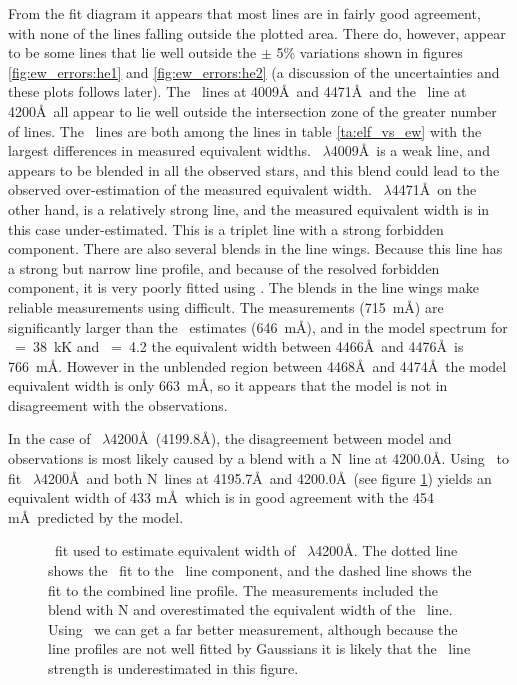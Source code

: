 From the fit diagram it appears that most lines are in fairly good
agreement, with none of the lines falling outside the plotted
area. There do, however, appear to be some lines that lie well
outside the $\pm$ 5\%  variations shown in figures
\ref{fig:ew_errors:he1} and \ref{fig:ew_errors:he2} (a discussion of
the uncertainties and these plots follows later). The \hei\ lines at
4009\AA\ and 4471\AA\ and the \heii\ line at 4200\AA\ all appear to
lie well outside the intersection zone of the greater number of
lines. The \hei\ lines are both among the lines in table
\ref{ta:elf_vs_ew} with the largest differences in measured equivalent
widths. \hei\ $\lambda$4009\AA\ is a weak line, and appears to be
blended in all the observed stars, and this blend could lead to the
observed over-estimation of the measured equivalent width. \hei\
$\lambda$4471\AA\ on the other hand, is a relatively strong line, and
the measured equivalent width is in this case under-estimated. This is a
triplet line with a strong forbidden component. There are also
several blends in the line wings. Because this line has a strong but
narrow line profile, and because of the resolved forbidden component,
it is very poorly fitted using \elf. The blends in the line wings make
reliable measurements using  difficult. The \comm{ew}
measurements (715~m\AA) are significantly larger than the \elf\
estimates (646~m\AA), and in the model spectrum for \teff ~=~38~kK and
\logg ~=~4.2 the equivalent width between 4466\AA\ and 4476\AA\ is
766~m\AA. However in the unblended region between 4468\AA\ and
4474\AA\ the model equivalent width is only 663~m\AA, so it appears
that the model is not in disagreement with the observations.

In the case of \heii\ $\lambda$4200\AA\ (4199.8\AA), the disagreement
between model and observations is most likely caused by a blend with
a N\ line at 4200.0\AA. Using \elf\ to fit \heii\
$\lambda$4200\AA\ and both N\scr{3}\ lines at 4195.7\AA\ and 4200.0\AA\
(see figure \ref{fig:he2_4200fit}) yields an equivalent width of 433
m\AA\ which is in good agreement with the 454 m\AA\ predicted by the model.

\begin{figure} %

\epsfxsize=12cm
\setlength{\cen}{(\textwidth / 2) - (\epsfxsize / 2)}
\hspace{\cen}

\caption[\elf\ fit to \heii\ $\lambda$4200\AA]
{\fcfont \elf\ fit used to estimate equivalent width of \heii\
$\lambda$4200\AA. The dotted line shows the \elf\ fit to the \heii\
line component, and the dashed line shows the fit to the combined line
profile. The \comm{ew} measurements included the blend with N
and overestimated the equivalent width of the \heii\ line. Using \elf\
we can get a far better measurement, although because the line
profiles are not well fitted by Gaussians it is likely that the \heii\
line strength is underestimated in this figure.}
\label{fig:he2_4200fit}
\end{figure} %


